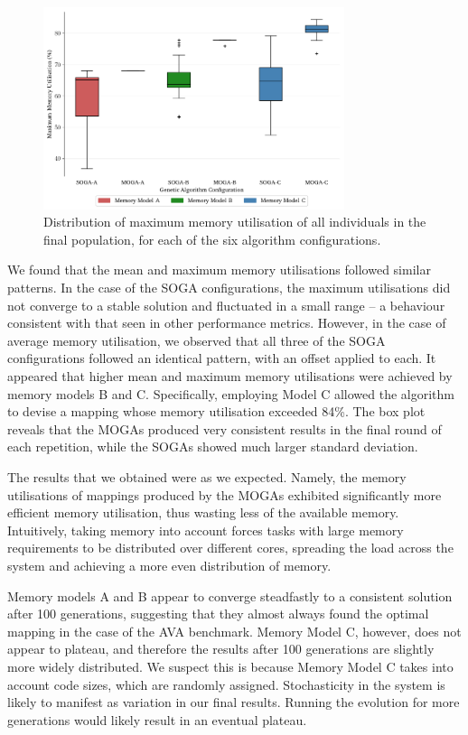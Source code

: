 \documentclass[conference]{IEEEtran}
\begin{document}
\begin{figure}[!h]
  \centering
  \includegraphics*[width=8.8cm,keepaspectratio]{img/maximum_memory_util_box}
  \caption{Distribution of maximum memory utilisation of all individuals in the final population, for each of the six algorithm configurations.}
  \label{fig:minimum_memory_utilisation_box}
\vspace{-3.1ex}
\end{figure}

We found that the mean and maximum memory utilisations followed similar patterns. In the case of the SOGA configurations, the maximum utilisations did not converge to a stable solution and fluctuated in a small range -- a behaviour consistent with that seen in other performance metrics. However, in the case of average memory utilisation, we observed that all three of the SOGA configurations followed an identical pattern, with an offset applied to each. It appeared that higher mean and maximum memory utilisations were achieved by memory models B and C. Specifically, employing Model C allowed the algorithm to devise a mapping whose memory utilisation exceeded 84\%. The box plot reveals that the MOGAs produced very consistent results in the final round of each repetition, while the SOGAs showed much larger standard deviation. 

The results that we obtained were as we expected. Namely, the memory utilisations of mappings produced by the MOGAs exhibited significantly more efficient memory utilisation, thus wasting less of the available memory. Intuitively, taking memory into account forces tasks with large memory requirements to be distributed over different cores, spreading the load across the system and achieving a more even distribution of memory.

Memory models A and B appear to converge steadfastly to a consistent solution after 100 generations, suggesting that they almost always found the optimal mapping in the case of the AVA benchmark. Memory Model C, however, does not appear to plateau, and therefore the results after 100 generations are slightly more widely distributed. We suspect this is because Memory Model C takes into account code sizes, which are randomly assigned. Stochasticity in the system is likely to manifest as variation in our final results. Running the evolution for more generations would likely result in an eventual plateau.
\end{document}
